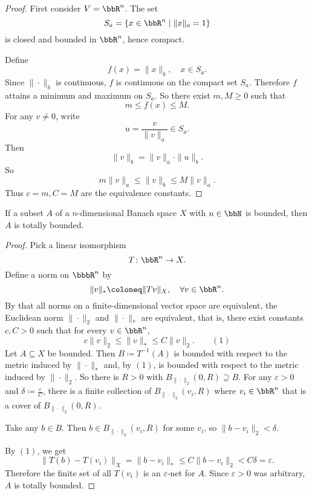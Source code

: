 \documentclass[a4paper,12pt]{article}
\begin{document}
\begin{proof}
    First consider $V=\bbR^n$. The set
    \[S_a=\{x\in\bbR^n\mid\|x\|_a=1\}\]
    is closed and bounded in $\bbR^n$, hence compact.

    Define
    \[f(x)=\|x\|_b,\quad x\in S_a.\]
    Since $\|\cdot\|_b$ is continuous, $f$ is continuous on the compact set $S_a$. Therefore $f$ attains a minimum and maximum on $S_a$. So there exist $m,M\geq 0$ such that
    \[m\leq f(x)\leq M.\]
    For any $v\neq 0$, write
    \[u=\frac{v}{\|v\|_a}\in S_a.\]
    Then
    \[\|v\|_b=\|v\|_a\cdot\|u\|_b.\]
    So
    \[m\|v\|_a\leq\|v\|_b\leq M\|v\|_a.\]
    Thus $c=m,C=M$ are the equivalence constants.
\end{proof}
 If a subset $A$ of a $n$-dimensional Banach space $X$ with $n\in\bbN$ is bounded, then $A$ is totally bounded.

\begin{proof}
    Pick a linear isomorphism
    \[T\colon\bbR^n\to X.\]
    Define a norm on $\bbbR^n$ by
    \[\|v\|_*\coloneq\|Tv\|_X,\quad\forall v\in\bbR^n.\]
    By that all norms on a finite-dimensional vector space are equivalent, the Euclidean norm $\|\cdot\|_2$ and $\|\cdot\|_*$ are equivalent, that is, there exist constants $c,C>0$ such that for every $v\in \bbR^n$,
    \[c\|v\|_2\leq\|v\|_*\leq C\|v\|_2.\qquad (1)\]
    Let $A\subseteq X$ be bounded. Then $B\coloneq T^{-1}(A)$ is bounded with respect to the metric induced by $\|\cdot\|_*$ and, by $(1)$, is bounded with respect to the metric induced by $\|\cdot\|_2$. So there is $R>0$ with $B_{\|\cdot\|_2}(0,R)\supseteq B$.
    For any $\varepsilon>0$ and $\delta\coloneq\frac{\varepsilon}{C}$, there is a finite collection of $B_{\|\cdot\|_2}(v_i,R)$ where $v_i\in\bbR^n$ that is a cover of $B_{\|\cdot\|_2}(0,R)$.

    Take any $b\in B$. Then $b\in B_{\|\cdot\|_2}(v_i,R)$ for some $v_i$, so $\|b-v_i\|_2<\delta$.

    By $(1)$, we get
    \[\|T(b)-T(v_i)\|_X=\|b-v_i\|_*\leq C\|b-v_i\|_2<C\delta=\varepsilon.\]
    Therefore the finite set of all $T(v_i)$ is an $\varepsilon$-net for $A$. Since $\varepsilon>0$ was arbitrary, $A$ is totally bounded.
\end{proof}
\end{document}
